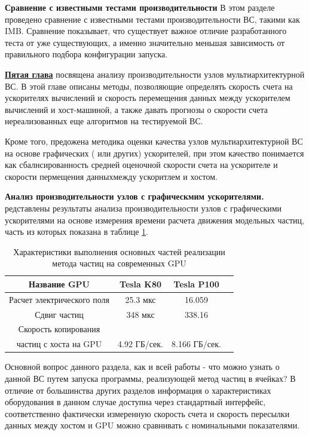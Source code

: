 \textbf{Сравнение с известными тестами производительности}
В этом разделе проведено сравнение с известными тестами производительности ВС, такими как IMB. Сравнение показывает, что существует важное отличие разработанного теста от уже существующих, а именно значительно меньшая зависимость от правильного подбора конфигурации запуска.  

\underline{\textbf{Пятая глава}} посвящена 
анализу производительности узлов мультиархитектурной ВС.
В этой главе описаны методы, позволяющие определять скорость счета на ускорителях вычислений и скорость перемещения данных между ускорителем вычислений и хост-машиной, а также давать прогнозы о скорости счета нереализованных еще алгоритмов на тестируемой ВС.

Кроме того, предожена методика оценки качества узлов мультиархитектурной ВС на основе графических ( или других) ускорителей, при этом качество понимается как сбалнсированность средней оценочной скорости счета на ускорителе и скорости пермещения данныхмежду ускоритлем и хостом. 

\textbf{Анализ производительности узлов с графическмим ускорителями.}
редставлены результаты анализа производительности узлов с графическими ускорителями на основе измерения времени расчета движения модельных частиц, часть из которых показана в таблице \ref{PerfGPU}.

\begin{table}[ht]
	\begin{center}
		\caption{Характеристики выполнения основных частей реализации метода частиц на современных GPU}
		\begin{tabular}{|c|c|c|c|}
			\hline
			Название GPU                &  Tesla K80   & Tesla P100 \\ \hline
			Расчет электрического поля  &  25.3 мкс    &  16.059    \\ \hline
			Сдвиг частиц                &  348 мкс     &  338.16    \\ \hline
			Скорость копирования        &              &            \\
			частиц с хоста на GPU       & 4.92 ГБ/сек. &8.166 ГБ/сек.  \\ \hline
		\end{tabular}
		\label{PerfGPU}
	\end{center}
\end{table}

Основной вопрос данного раздела, как и всей работы - что можно узнать о данной ВС путем запуска программы, реализующей метод частиц в ячейках? В отличие от 	большинства других разделов информация о характеристиках оборудования в данном случае доступна через стандартный интерфейс, соответственно фактически измеренную скорость счета и скорость пересылки данных между хостом и GPU можно сравнивать с номинальными показателями.

